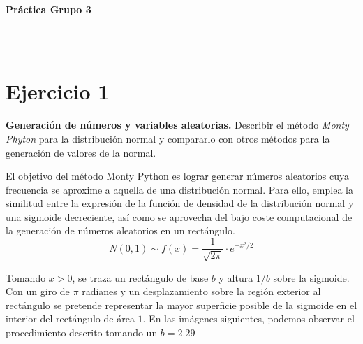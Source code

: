 \documentclass[a4paper,12pt]{article}
\begin{document}
	
	\setlength{\parindent}{0.5cm}
	\setlength{\voffset}{-2cm}
	\setlength{\hoffset}{-2cm}
	
	\begin{center}
		\begin{LARGE}
			\textbf{Práctica Grupo 3}
		\end{LARGE}
		\begin{Large}
			\\ \medskip {}
		\end{Large}
		\rule{17cm}{0.5mm}
	\end{center}
	
	
	\tableofcontents
	
\newpage
	\section*{Ejercicio 1}
	\textbf{Generación de números y variables aleatorias.} Describir el método \textit{Monty Phyton} para la distribución normal y compararlo con otros métodos para la
generación de valores de la normal.
	
	El objetivo del método Monty Python es lograr generar números aleatorios cuya frecuencia se aproxime a aquella de una distribución normal. Para ello, emplea la similitud entre la expresión de la función de densidad de la distribución normal y una sigmoide decreciente, así como se aprovecha del bajo coste computacional de la generación de números aleatorios en un rectángulo.
	$$ N(0,1) \sim f(x) = \dfrac{1}{\sqrt{2\pi}} \cdot e^{-x^2/2} $$
	
	Tomando $x>0$, se traza un rectángulo de base $b$ y altura $1/b$ sobre la sigmoide. Con un giro de $\pi$ radianes y un desplazamiento sobre la región exterior al rectángulo se pretende representar la mayor superficie posible de la sigmoide en el interior del rectángulo de área $1$. En las imágenes siguientes, podemos observar el procedimiento descrito tomando un $b=2.29$
	
\end{document}
